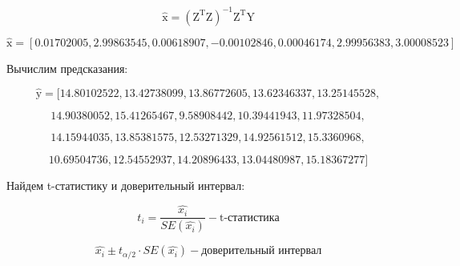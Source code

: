\begin{equation*}
    \hat{\textrm{x}} = (\textrm{Z}^\textrm{T} \textrm{Z})^{-1}\textrm{Z}^\textrm{T} \textrm{Y} 
\end{equation*}

\vspace{-1\baselineskip}

\begin{equation*}
    \hat{\textrm{x}} = [0.01702005,   2.99863545,   0.00618907,  -0.00102846,   0.00046174,   2.99956383, 3.00008523] 
\end{equation*}

\newpage

Вычислим предсказания:

\begin{equation*}
    \hat{\textrm{y}} = [14.80102522, 13.42738099, 13.86772605, 13.62346337, 13.25145528, 
\end{equation*}

\vspace{-1.5\baselineskip}

\begin{equation*}
    14.90380052, 15.41265467,  9.58908442, 10.39441943, 11.97328504, 
\end{equation*}

\vspace{-1.5\baselineskip}

\begin{equation*}
    14.15944035, 13.85381575, 12.53271329, 14.92561512, 15.3360968,
\end{equation*}

\vspace{-1.5\baselineskip}

\begin{equation*}
    10.69504736, 12.54552937, 14.20896433, 13.04480987, 15.18367277] 
\end{equation*}

Найдем t-статистику и доверительный интервал:

\vspace{-1\baselineskip}

\begin{equation*}
    t_i = \frac{\hat{x_i}}{SE(\hat{x_i})} - \textrm{t-статистика}
\end{equation*}

\vspace{-1\baselineskip}

\begin{equation*}
    \hat{x_i} \pm t_{\alpha / 2} \cdot SE(\hat{x_i}) - \textrm{доверительный интервал}
\end{equation*}

